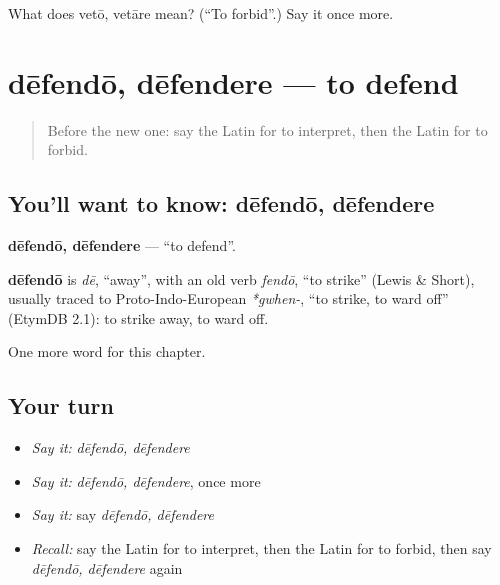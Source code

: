 \begin{tcolorbox}[breakable,colback=teal!4,colframe=teal!35!black,title={Before you move on}]
What does vetō, vetāre mean? (\textquotedblleft{}To forbid\textquotedblright{}.) Say it once more.
\end{tcolorbox}
\section[dēfendō, dēfendere]{dēfendō, dēfendere — to defend}

\label{lesson:LA-C198-defendo}



\begin{quote}
Before the new one: say the Latin for to interpret, then the Latin for to forbid.
\end{quote}

\subsection*{You'll want to know: dēfendō, dēfendere}
\textbf{dēfendō, dēfendere} — \textquotedblleft{}to defend\textquotedblright{}.

\begin{cousinweb}
\textbf{dēfendō} is \emph{dē}, \textquotedblleft{}away\textquotedblright{}, with an old verb \emph{fendō}, \textquotedblleft{}to strike\textquotedblright{} (Lewis \& Short), usually traced to Proto-Indo-European \emph{*gwhen-}, \textquotedblleft{}to strike, to ward off\textquotedblright{} (EtymDB 2.1): to strike away, to ward off.
\end{cousinweb}

\begin{grammarlens}[title={What you've built}]
One more word for this chapter.
\end{grammarlens}

\subsection*{Your turn}
\begin{itemize}
\raggedright
  \item \emph{Say it:} \emph{dēfendō, dēfendere}
  \item \emph{Say it:} \emph{dēfendō, dēfendere}, once more
  \item \emph{Say it:} say \emph{dēfendō, dēfendere}
  \item \emph{Recall:} say the Latin for to interpret, then the Latin for to forbid, then say \emph{dēfendō, dēfendere} again
\end{itemize}

